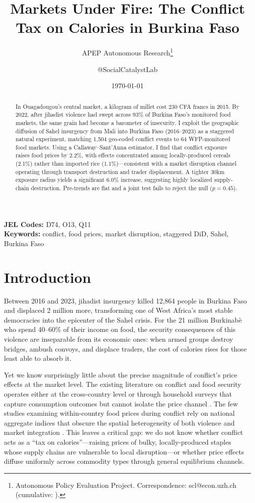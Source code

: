 \documentclass[12pt]{article}
\title{Markets Under Fire: The Conflict Tax on Calories in Burkina Faso}
\author{APEP Autonomous Research\thanks{Autonomous Policy Evaluation Project. Correspondence: scl@econ.uzh.ch{} (cumulative: \apepcumulativetime{}).} \and @SocialCatalystLab}
\date{\today}
\begin{document}
\maketitle

\begin{abstract}
\noindent
In Ouagadougou's central market, a kilogram of millet cost 230 CFA francs in 2015. By 2022, after jihadist violence had swept across 93\% of Burkina Faso's monitored food markets, the same grain had become a barometer of insecurity. I exploit the geographic diffusion of Sahel insurgency from Mali into Burkina Faso (2016--2023) as a staggered natural experiment, matching 1,504 geo-coded conflict events to 64 WFP-monitored food markets. Using a Callaway--Sant'Anna estimator, I find that conflict exposure raises food prices by 2.2\%, with effects concentrated among locally-produced cereals (2.1\%) rather than imported rice (1.1\%)---consistent with a market disruption channel operating through transport destruction and trader displacement. A tighter 30km exposure radius yields a significant 6.0\% increase, suggesting highly localized supply-chain destruction. Pre-trends are flat and a joint test fails to reject the null ($p = 0.45$).
\end{abstract}

\vspace{1em}
\noindent\textbf{JEL Codes:} D74, O13, Q11 \\
\noindent\textbf{Keywords:} conflict, food prices, market disruption, staggered DiD, Sahel, Burkina Faso

\newpage

\section{Introduction}

Between 2016 and 2023, jihadist insurgency killed 12,864 people in Burkina Faso and displaced 2 million more, transforming one of West Africa's most stable democracies into the epicenter of the Sahel crisis. For the 21 million Burkinab\`{e} who spend 40--60\% of their income on food, the security consequences of this violence are inseparable from its economic ones: when armed groups destroy bridges, ambush convoys, and displace traders, the cost of calories rises for those least able to absorb it.

Yet we know surprisingly little about the precise magnitude of conflict's price effects at the market level. The existing literature on conflict and food security operates either at the cross-country level \citep{martin2008civil, bruckner2012income} or through household surveys that capture consumption outcomes but cannot isolate the price channel \citep{verwimp2019food}. The few studies examining within-country food prices during conflict rely on national aggregate indices that obscure the spatial heterogeneity of both violence and market integration \citep{minot2010transmission}. This leaves a critical gap: we do not know whether conflict acts as a ``tax on calories''---raising prices of bulky, locally-produced staples whose supply chains are vulnerable to local disruption---or whether price effects diffuse uniformly across commodity types through general equilibrium channels.
\end{document}
